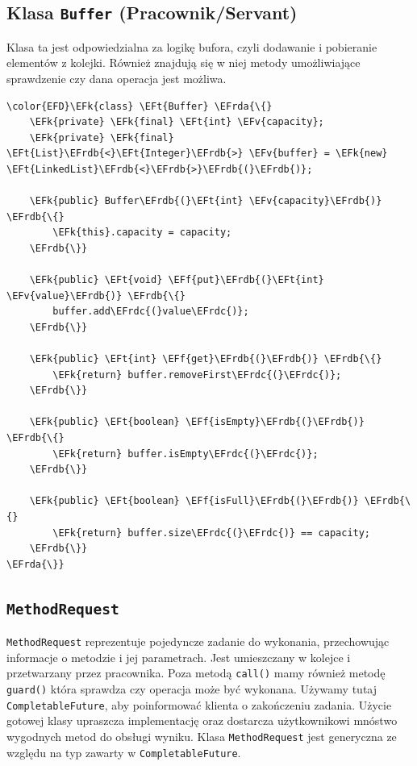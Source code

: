 \documentclass[11pt]{article}
\newcommand{\EFk}[1]{\textcolor{EFk}{#1}} %
\newcommand{\EFf}[1]{\textcolor{EFf}{#1}} %
\newcommand{\EFv}[1]{\textcolor{EFv}{#1}} %
\newcommand{\EFt}[1]{\textcolor{EFt}{#1}} %
\newcommand{\EFrda}[1]{\textcolor{EFrda}{#1}} %
\newcommand{\EFrdb}[1]{\textcolor{EFrdb}{#1}} %
\newcommand{\EFrdc}[1]{\textcolor{EFrdc}{#1}} %
\begin{document}
\subsection*{Klasa \texttt{Buffer} (Pracownik/Servant)}
\label{sec:org4c694f3}
Klasa ta jest odpowiedzialna za logikę bufora, czyli dodawanie i pobieranie
elementów z kolejki. Również znajdują się w niej metody umożliwiające sprawdzenie
czy dana operacja jest możliwa.

\begin{Code}
\begin{Verbatim}
\color{EFD}\EFk{class} \EFt{Buffer} \EFrda{\{}
    \EFk{private} \EFk{final} \EFt{int} \EFv{capacity};
    \EFk{private} \EFk{final} \EFt{List}\EFrdb{<}\EFt{Integer}\EFrdb{>} \EFv{buffer} = \EFk{new} \EFt{LinkedList}\EFrdb{<}\EFrdb{>}\EFrdb{(}\EFrdb{)};

    \EFk{public} Buffer\EFrdb{(}\EFt{int} \EFv{capacity}\EFrdb{)} \EFrdb{\{}
        \EFk{this}.capacity = capacity;
    \EFrdb{\}}

    \EFk{public} \EFt{void} \EFf{put}\EFrdb{(}\EFt{int} \EFv{value}\EFrdb{)} \EFrdb{\{}
        buffer.add\EFrdc{(}value\EFrdc{)};
    \EFrdb{\}}

    \EFk{public} \EFt{int} \EFf{get}\EFrdb{(}\EFrdb{)} \EFrdb{\{}
        \EFk{return} buffer.removeFirst\EFrdc{(}\EFrdc{)};
    \EFrdb{\}}

    \EFk{public} \EFt{boolean} \EFf{isEmpty}\EFrdb{(}\EFrdb{)} \EFrdb{\{}
        \EFk{return} buffer.isEmpty\EFrdc{(}\EFrdc{)};
    \EFrdb{\}}

    \EFk{public} \EFt{boolean} \EFf{isFull}\EFrdb{(}\EFrdb{)} \EFrdb{\{}
        \EFk{return} buffer.size\EFrdc{(}\EFrdc{)} == capacity;
    \EFrdb{\}}
\EFrda{\}}
\end{Verbatim}
\end{Code}
\subsection*{\texttt{MethodRequest}}
\label{sec:org3268bf8}
\texttt{MethodRequest} reprezentuje pojedyncze zadanie do wykonania, przechowując
informacje o metodzie i jej parametrach. Jest umieszczany w kolejce i
przetwarzany przez pracownika.
Poza metodą \texttt{call()} mamy również metodę \texttt{guard()} która sprawdza czy operacja może
być wykonana. Używamy tutaj \texttt{CompletableFuture}, aby poinformować klienta o
zakończeniu zadania.  Użycie gotowej klasy upraszcza implementację oraz
dostarcza użytkownikowi mnóstwo wygodnych metod do obsługi wyniku.
Klasa \texttt{MethodRequest} jest generyczna ze względu na typ zawarty w \texttt{CompletableFuture}.
\end{document}
